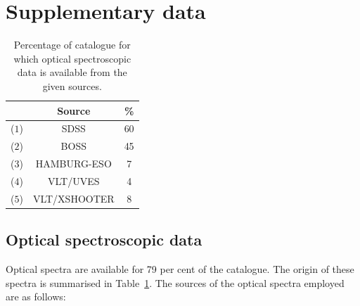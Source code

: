 \section{Supplementary data}

\begin{table}
  \centering
  \footnotesize 
  \caption{Percentage of catalogue for which optical spectroscopic data is available from the given sources.}
  \label{tab:optical-data}
    \begin{tabular}{ccc}
    \hline
    & Source & \% \\
    \hline
    ($1$) & SDSS & 60 \\
    ($2$) & BOSS & 45 \\
    ($3$) & HAMBURG-ESO & 7 \\
    ($4$) & VLT/UVES & 4 \\
    ($5$) & VLT/XSHOOTER & 8 \\ 
    \hline
    \end{tabular}
\end{table} 

\subsection{Optical spectroscopic data}

Optical spectra are available for 79 per cent of the catalogue. 
The origin of these spectra is summarised in Table~\ref{tab:optical-data}. 
The sources of the optical spectra employed are as follows:


